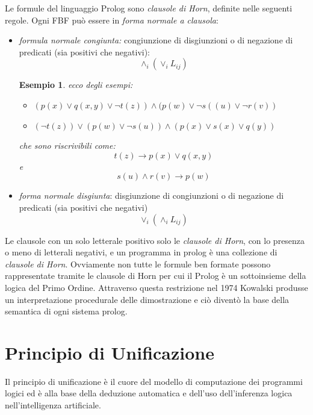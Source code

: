 \documentclass[a4paper]{report}
\newtheorem{esempio}{Esempio}
\begin{document}
Le formule del linguaggio Prolog sono \emph{clausole di Horn}, definite nelle seguenti regole.
Ogni FBF può essere in \emph{forma normale a clausola}:
\begin{itemize}
\item \emph{formula normale congiunta:} congiunzione di disgiunzioni o di negazione di predicati (sia positivi che negativi):
  \begin{equation*}
    \land_i(\lor_iL_{ij})
  \end{equation*}
\begin{esempio}
ecco degli esempi:
\begin{itemize}
\item $(p(x)\vee q(x,y)\vee \neg t(z))\wedge(p(w)\vee\neg s((u)\vee \neg r(v))$
\item $(\neg t(z))\vee (p(w)\vee\neg s(u))\wedge (p(x)\vee s(x)\vee q(y))$
\end{itemize}
che sono riscrivibili come:
\begin{equation*}
  t(z)\to p(x)\vee q(x,y)
\end{equation*} 
e
\begin{equation*}
  s(u)\wedge r(v)\to p(w)
\end{equation*}
\end{esempio}

\item \textit{forma normale disgiunta}: disgiunzione di congiunzioni o di negazione di predicati (sia positivi che negativi)
  \begin{equation*}
    \lor_i(\land_i L_{ij})
  \end{equation*}
\end{itemize}
Le clausole con un solo letterale positivo solo le \textit{clausole di Horn}, con lo presenza o meno di letterali negativi,
e un programma in prolog è una collezione di \textit{clausole di Horn}.\newline
Ovviamente non tutte le formule ben formate possono rappresentate tramite le clausole di Horn per cui il Prolog è un sottoinsieme
della logica del Primo Ordine.\newline
Attraverso questa restrizione nel 1974 Kowalski produsse un interpretazione procedurale delle dimostrazione e ciò diventò la base
della semantica di ogni sistema prolog.

\section{Principio di Unificazione}
Il principio di unificazione è il cuore del modello di computazione dei programmi logici ed è alla base della deduzione automatica
e dell'uso dell'inferenza logica nell'intelligenza artificiale.
\end{document}
